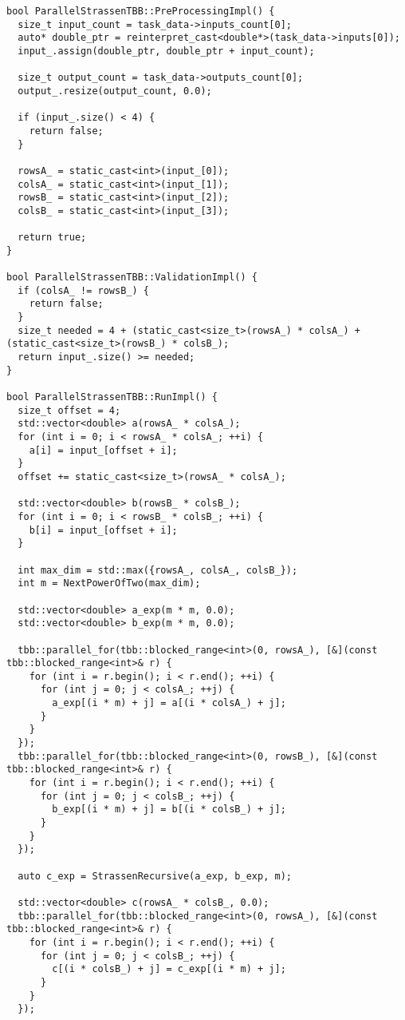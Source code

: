 \documentclass[12pt]{article}
\begin{document}
\begin{lstlisting}
bool ParallelStrassenTBB::PreProcessingImpl() {
  size_t input_count = task_data->inputs_count[0];
  auto* double_ptr = reinterpret_cast<double*>(task_data->inputs[0]);
  input_.assign(double_ptr, double_ptr + input_count);

  size_t output_count = task_data->outputs_count[0];
  output_.resize(output_count, 0.0);

  if (input_.size() < 4) {
    return false;
  }

  rowsA_ = static_cast<int>(input_[0]);
  colsA_ = static_cast<int>(input_[1]);
  rowsB_ = static_cast<int>(input_[2]);
  colsB_ = static_cast<int>(input_[3]);

  return true;
}

bool ParallelStrassenTBB::ValidationImpl() {
  if (colsA_ != rowsB_) {
    return false;
  }
  size_t needed = 4 + (static_cast<size_t>(rowsA_) * colsA_) + (static_cast<size_t>(rowsB_) * colsB_);
  return input_.size() >= needed;
}

bool ParallelStrassenTBB::RunImpl() {
  size_t offset = 4;
  std::vector<double> a(rowsA_ * colsA_);
  for (int i = 0; i < rowsA_ * colsA_; ++i) {
    a[i] = input_[offset + i];
  }
  offset += static_cast<size_t>(rowsA_ * colsA_);

  std::vector<double> b(rowsB_ * colsB_);
  for (int i = 0; i < rowsB_ * colsB_; ++i) {
    b[i] = input_[offset + i];
  }

  int max_dim = std::max({rowsA_, colsA_, colsB_});
  int m = NextPowerOfTwo(max_dim);

  std::vector<double> a_exp(m * m, 0.0);
  std::vector<double> b_exp(m * m, 0.0);

  tbb::parallel_for(tbb::blocked_range<int>(0, rowsA_), [&](const tbb::blocked_range<int>& r) {
    for (int i = r.begin(); i < r.end(); ++i) {
      for (int j = 0; j < colsA_; ++j) {
        a_exp[(i * m) + j] = a[(i * colsA_) + j];
      }
    }
  });
  tbb::parallel_for(tbb::blocked_range<int>(0, rowsB_), [&](const tbb::blocked_range<int>& r) {
    for (int i = r.begin(); i < r.end(); ++i) {
      for (int j = 0; j < colsB_; ++j) {
        b_exp[(i * m) + j] = b[(i * colsB_) + j];
      }
    }
  });

  auto c_exp = StrassenRecursive(a_exp, b_exp, m);

  std::vector<double> c(rowsA_ * colsB_, 0.0);
  tbb::parallel_for(tbb::blocked_range<int>(0, rowsA_), [&](const tbb::blocked_range<int>& r) {
    for (int i = r.begin(); i < r.end(); ++i) {
      for (int j = 0; j < colsB_; ++j) {
        c[(i * colsB_) + j] = c_exp[(i * m) + j];
      }
    }
  });


\end{lstlisting}
\end{document}
